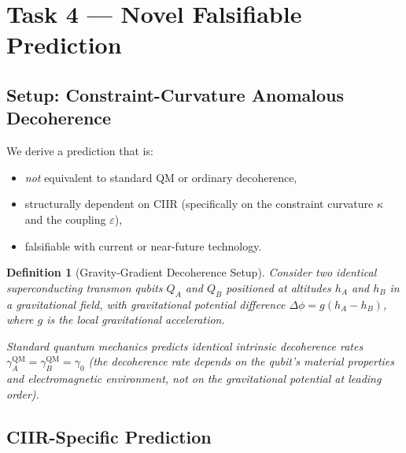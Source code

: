 \documentclass[11pt,a4paper]{article}
\newtheorem{definition}{Definition}[section]
\theoremstyle{remark}
\begin{document}
\bigskip
\noindent{}

\section{Task 4 --- Novel Falsifiable Prediction}
\label{sec:prediction}

\subsection{Setup: Constraint-Curvature Anomalous Decoherence}

We derive a prediction that is:
\begin{itemize}
  \item \emph{not} equivalent to standard QM or ordinary decoherence,
  \item structurally dependent on CIIR (specifically on the constraint
    curvature $\kappa$ and the coupling $\varepsilon$),
  \item falsifiable with current or near-future technology.
\end{itemize}

\begin{definition}[Gravity-Gradient Decoherence Setup]
\label{def:experiment}
Consider two identical superconducting transmon qubits $Q_A$ and $Q_B$
positioned at altitudes $h_A$ and $h_B$ in a gravitational field, with
gravitational potential difference
$\Delta\phi = g(h_A - h_B)$, where $g$ is the local gravitational
acceleration.

Standard quantum mechanics predicts identical intrinsic decoherence
rates $\gamma_A^{\mathrm{QM}} = \gamma_B^{\mathrm{QM}} = \gamma_0$
(the decoherence rate depends on the qubit's material properties and
electromagnetic environment, not on the gravitational potential at
leading order).
\end{definition}

\subsection{CIIR-Specific Prediction}
\end{document}
